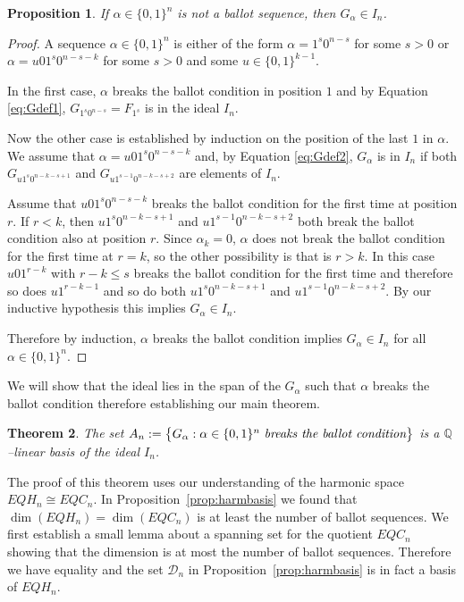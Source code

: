 \documentclass[11pt]{amsart}
\newtheorem{theorem}{Theorem}[section]
\newtheorem{prop}[theorem]{Proposition}
\theoremstyle{definition}
\numberwithin{equation}{section}
\begin{document}
\begin{prop}\label{prop:notballotimpliescontains}
If $\alpha \in \{0,1\}^n$ is not a ballot sequence, then $G_\alpha \in I_n$.
\end{prop}

\begin{proof}
A sequence $\alpha \in \{ 0, 1\}^n$ is either of the form
$\alpha = 1^s0^{n-s}$ for some $s > 0$ or
$\alpha = u01^s0^{n-s-k}$ for some $s>0$ and some $u \in \{0,1\}^{k-1}$.

In the first case, $\alpha$ breaks the ballot condition in position $1$
and by Equation \eqref{eq:Gdef1}, $G_{1^s0^{n-s}} = F_{1^s}$
is in the ideal $I_n$.

Now the other case is established by
induction on the position of the last $1$ in $\alpha$.
We assume that
$\alpha = u01^s0^{n-s-k}$ and, by Equation \eqref{eq:Gdef2},
$G_\alpha$ is in $I_n$ if both
$G_{u1^s0^{n-k-s+1}}$ and $G_{u1^{s-1}0^{n-k-s+2}}$
are elements of $I_n$.

Assume that $u01^s0^{n-s-k}$
breaks the ballot condition for the first time at position $r$.
If $r<k$, then
$u1^s0^{n-k-s+1}$ and $u1^{s-1}0^{n-k-s+2}$
both break the ballot condition also at position $r$.
Since $\alpha_k=0$, $\alpha$ does not break the ballot condition for the first
time at $r=k$, so the other possibility is that is $r>k$.
In this case $u01^{r-k}$ with $r-k \leq s$ breaks the ballot condition for the first time
and therefore so does $u1^{r-k-1}$ and so do both
$u1^s0^{n-k-s+1}$ and $u1^{s-1}0^{n-k-s+2}$.
By our inductive hypothesis this implies $G_\alpha \in I_n$.

Therefore by induction, $\alpha$ breaks the ballot condition implies $G_\alpha \in I_n$
for all $\alpha \in \{0,1\}^n$.
\end{proof}

We will  show that the ideal lies in the span of the $G_\alpha$ such
that $\alpha$ breaks the ballot condition therefore establishing our main theorem.

\begin{theorem}\label{thm:basisofideal}
The set $A_n:=\big\{ G_\alpha : \alpha \in \{0,1\}^n \text{ \it breaks the ballot condition}\big\}$
is a $\mathbb Q$--linear basis of the ideal $I_n$.
\end{theorem}

The proof of this theorem uses our understanding of the harmonic space $EQH_n\cong EQC_n$.
In Proposition~\ref{prop:harmbasis} we found that $\dim(EQH_n)=\dim(EQC_n)$ is at least the number of ballot sequences.
We first establish a small lemma about a spanning set for the quotient $EQC_n$ showing that  the dimension is at most  the number of ballot sequences.
Therefore we have equality
and the set ${\mathcal D}_n$ in Proposition~\ref{prop:harmbasis} is in fact a basis
of $EQH_n$.
\end{document}
